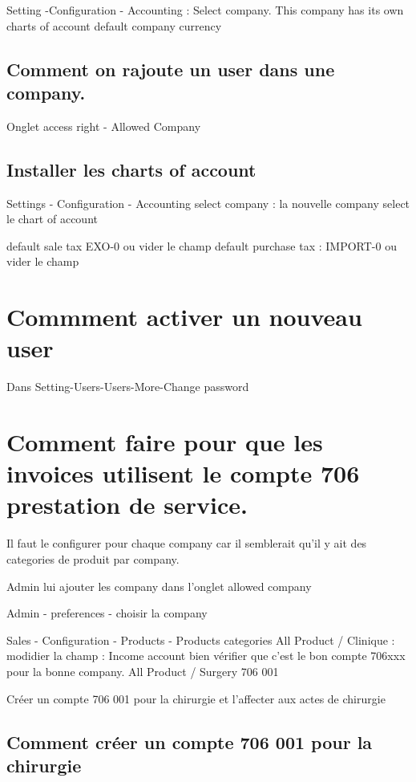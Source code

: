 \documentclass[12pt,a4paper]{article}
\begin{document}
Setting -Configuration - Accounting : Select company. This company has its own charts of account
default company currency

\subsection{Comment on rajoute un user dans une company.}
\label{sec:adduser_company}

Onglet access right - Allowed Company

\subsection{Installer les charts of account}
\label{sec:charts}

Settings - Configuration - Accounting 
select company : la nouvelle company
select le chart of account

default sale tax EXO-0 ou vider le champ
default purchase tax : IMPORT-0 ou vider le champ


\section{Commment activer un nouveau user}
\label{sec:active_user}

Dans Setting-Users-Users-More-Change password

\section{Comment faire pour que les invoices utilisent le compte 706 prestation de service.}
\label{sec:service}

Il faut le configurer pour chaque company car il semblerait qu'il y ait des categories de produit par company.

Admin lui ajouter les company dans l'onglet allowed company

Admin - preferences - choisir la company

Sales - Configuration - Products - Products categories All Product / Clinique : modidier la champ : Income account
bien vérifier que c'est le bon compte 706xxx pour la bonne company.
All Product / Surgery 706 001


Créer un compte 706 001 pour la chirurgie et l'affecter aux actes de chirurgie

\subsection{Comment créer un compte 706 001 pour la chirurgie}
\label{sec:706001}
\end{document}
